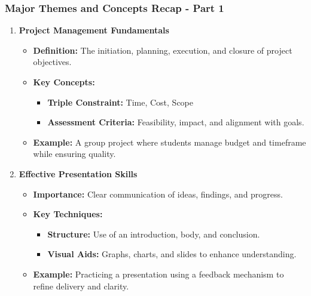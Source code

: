 \documentclass[aspectratio=169]{beamer}
\begin{document}
\begin{frame}[fragile]
    \frametitle{Major Themes and Concepts Recap - Part 1}
    \begin{enumerate}
        \item \textbf{Project Management Fundamentals}
            \begin{itemize}
                \item \textbf{Definition:} The initiation, planning, execution, and closure of project objectives.
                \item \textbf{Key Concepts:}
                    \begin{itemize}
                        \item \textbf{Triple Constraint:} Time, Cost, Scope
                        \item \textbf{Assessment Criteria:} Feasibility, impact, and alignment with goals.
                    \end{itemize}
                \item \textbf{Example:} A group project where students manage budget and timeframe while ensuring quality.
            \end{itemize}

        \item \textbf{Effective Presentation Skills}
            \begin{itemize}
                \item \textbf{Importance:} Clear communication of ideas, findings, and progress.
                \item \textbf{Key Techniques:}
                    \begin{itemize}
                        \item \textbf{Structure:} Use of an introduction, body, and conclusion.
                        \item \textbf{Visual Aids:} Graphs, charts, and slides to enhance understanding.
                    \end{itemize}
                \item \textbf{Example:} Practicing a presentation using a feedback mechanism to refine delivery and clarity.
            \end{itemize}
    \end{enumerate}
\end{frame}
\end{document}
